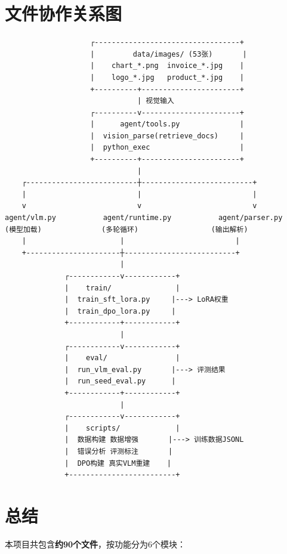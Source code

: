 \documentclass[fontset=none,11pt,a4paper]{ctexart}
\begin{document}
\section{文件协作关系图}

\begin{verbatim}
                    ┌----------------------------------+
                    |         data/images/ (53张)       |
                    |    chart_*.png  invoice_*.jpg    |
                    |    logo_*.jpg   product_*.jpg    |
                    +----------+-----------------------+
                               | 视觉输入
                    ┌----------v-----------------------+
                    |      agent/tools.py              |
                    |  vision_parse(retrieve_docs)     |
                    |  python_exec                     |
                    +----------+-----------------------+
                               |
    ┌--------------------------┼--------------------------+
    |                          |                          |
    v                          v                          v
agent/vlm.py           agent/runtime.py           agent/parser.py
(模型加载)              (多轮循环)                 (输出解析)
    |                      |                          |
    +----------------------┼--------------------------+
                           |
              ┌------------v------------+
              |    train/               |
              |  train_sft_lora.py     |---> LoRA权重
              |  train_dpo_lora.py     |
              +------------+------------+
                           |
              ┌------------v------------+
              |    eval/                |
              |  run_vlm_eval.py       |---> 评测结果
              |  run_seed_eval.py      |
              +------------+------------+
                           |
              ┌------------v------------+
              |    scripts/             |
              |  数据构建 数据增强       |---> 训练数据JSONL
              |  错误分析 评测标注       |
              |  DPO构建 真实VLM重建    |
              +-------------------------+
\end{verbatim}

\section{总结}

本项目共包含\textbf{约90个文件}，按功能分为6个模块：
\end{document}
